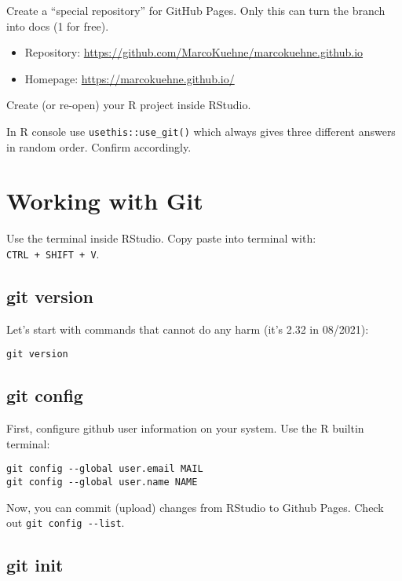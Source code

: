 \documentclass[
]{book}
\providecommand{\tightlist}{%
  \setlength{\itemsep}{0pt}\setlength{\parskip}{0pt}}
\begin{document}
Create a ``special repository'' for GitHub Pages. Only this can turn the branch into docs (1 for free).

\begin{itemize}
\tightlist
\item
  Repository: \url{https://github.com/MarcoKuehne/marcokuehne.github.io}
\item
  Homepage: \url{https://marcokuehne.github.io/}
\end{itemize}

Create (or re-open) your R project inside RStudio.

In R console use \texttt{usethis::use\_git()} which always gives three different answers in random order. Confirm accordingly.

\hypertarget{working-with-git}{%
\section{Working with Git}\label{working-with-git}}

Use the terminal inside RStudio. Copy paste into terminal with: \texttt{CTRL\ +\ SHIFT\ +\ V}.

\hypertarget{git-version}{%
\subsection{git version}\label{git-version}}

Let's start with commands that cannot do any harm (it's 2.32 in 08/2021):

\begin{verbatim}
git version
\end{verbatim}

\hypertarget{git-config}{%
\subsection{git config}\label{git-config}}

First, configure github user information on your system. Use the R builtin terminal:

\begin{verbatim}
git config --global user.email MAIL
git config --global user.name NAME
\end{verbatim}

Now, you can commit (upload) changes from RStudio to Github Pages. Check out \texttt{git\ config\ -\/-list}.

\hypertarget{git-init}{%
\subsection{git init}\label{git-init}}
\end{document}
